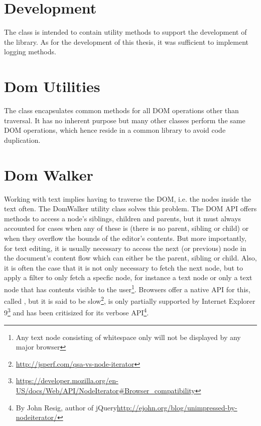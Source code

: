 



\section{Development}

The  class is intended to contain utility methods to support the development of the library. As for the development of this thesis, it was sufficient to implement logging methods.

\section{Dom Utilities}

The  class encapsulates common methods for all DOM operations other than traversal. It has no inherent purpose but many other classes perform the same DOM operations, which hence reside in a common library to avoid code duplication.

\section{Dom Walker}

Working with text implies having to traverse the DOM, i.e. the nodes inside the text often. The {DomWalker} utility class solves this problem. The DOM API offers methods to access a node's siblings, children and parents, but it must always accounted for cases when any of these is  (there is no parent, sibling or child) or when they overflow the bounds of the editor's contents. But more importantly, for text editing, it is usually necessary to access the next (or previous) node in the document's content flow which can either be the parent, sibling or child. Also, it is often the case that it is not only necessary to fetch the next node, but to apply a filter to only fetch a specfic node, for instance a text node or only a text node that has contents visible to the user\footnote{Any text node consisting of whitespace only will not be displayed by any major browser}. Browsers offer a native API for this, called , but it is said to be slow\footnote{\url{http://jsperf.com/qsa-vs-node-iterator}}, is only partially supported by Internet Explorer 9\footnote{\url{https://developer.mozilla.org/en-US/docs/Web/API/NodeIterator\#Browser_compatibility}} and has been critisized for its verbose API\footnote{By John Resig, author of jQuery\url{http://ejohn.org/blog/unimpressed-by-nodeiterator/}}.


